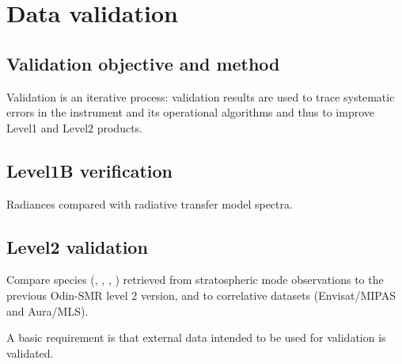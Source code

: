 \chapter{Data validation}


\section{Validation objective and method}
Validation is an iterative process: validation results are used to trace
systematic errors in the instrument and its operational algorithms and thus 
to improve Level1 and Level2 products.


\section{Level1B verification}

Radiances compared with radiative transfer model spectra.

\section{Level2 validation}

Compare species (, , , )
retrieved from stratospheric mode 
observations to the previous Odin-SMR level 2 version, 
and to correlative datasets (Envisat/MIPAS and Aura/MLS).

A basic requirement is that external data intended to be used 
for validation is validated.
 


 
